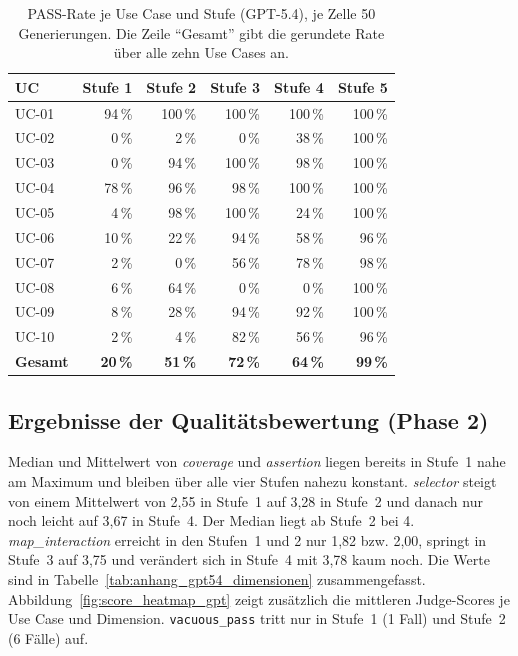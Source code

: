 \begin{table}[H]
    \centering
    \caption[PASS-Rate je Use Case und Stufe (GPT-5.4)]{PASS-Rate je Use Case und Stufe (GPT-5.4), je Zelle 50 Generierungen. Die Zeile \enquote{Gesamt} gibt die gerundete Rate über alle zehn Use Cases an.}
    \label{tab:anhang_gpt54_pass_matrix}
    \begin{tabular}{lrrrrr}
        \toprule
        UC & Stufe 1 & Stufe 2 & Stufe 3 & Stufe 4 & Stufe 5 \\
        \midrule
        UC-01 & 94\,\%  & 100\,\% & 100\,\% & 100\,\% & 100\,\% \\
        UC-02 & 0\,\%   & 2\,\%   & 0\,\%   & 38\,\%  & 100\,\% \\
        UC-03 & 0\,\%   & 94\,\%  & 100\,\% & 98\,\%  & 100\,\% \\
        UC-04 & 78\,\%  & 96\,\%  & 98\,\%  & 100\,\% & 100\,\% \\
        UC-05 & 4\,\%   & 98\,\%  & 100\,\% & 24\,\%  & 100\,\% \\
        UC-06 & 10\,\%  & 22\,\%  & 94\,\%  & 58\,\%  & 96\,\%  \\
        UC-07 & 2\,\%   & 0\,\%   & 56\,\%  & 78\,\%  & 98\,\%  \\
        UC-08 & 6\,\%   & 64\,\%  & 0\,\%   & 0\,\%   & 100\,\% \\
        UC-09 & 8\,\%   & 28\,\%  & 94\,\%  & 92\,\%  & 100\,\% \\
        UC-10 & 2\,\%   & 4\,\%   & 82\,\%  & 56\,\%  & 96\,\%  \\
        \midrule
        \textbf{Gesamt} & \textbf{20\,\%} & \textbf{51\,\%} & \textbf{72\,\%} & \textbf{64\,\%} & \textbf{99\,\%} \\
        \bottomrule
    \end{tabular}
\end{table}

\subsection{Ergebnisse der Qualitätsbewertung (Phase 2)}

Median und Mittelwert von \emph{coverage} und \emph{assertion} liegen bereits in Stufe~1 nahe am Maximum und bleiben über alle vier Stufen nahezu konstant. \emph{selector} steigt von einem Mittelwert von 2,55 in Stufe~1 auf 3,28 in Stufe~2 und danach nur noch leicht auf 3,67 in Stufe~4. Der Median liegt ab Stufe~2 bei 4. \emph{map\_interaction} erreicht in den Stufen~1 und 2 nur 1,82 bzw. 2,00, springt in Stufe~3 auf 3,75 und verändert sich in Stufe~4 mit 3,78 kaum noch. Die Werte sind in Tabelle~\ref{tab:anhang_gpt54_dimensionen} zusammengefasst. Abbildung~\ref{fig:score_heatmap_gpt} zeigt zusätzlich die mittleren Judge-Scores je Use Case und Dimension. \texttt{vacuous\_pass} tritt nur in Stufe~1 (1 Fall) und Stufe~2 (6 Fälle) auf.

